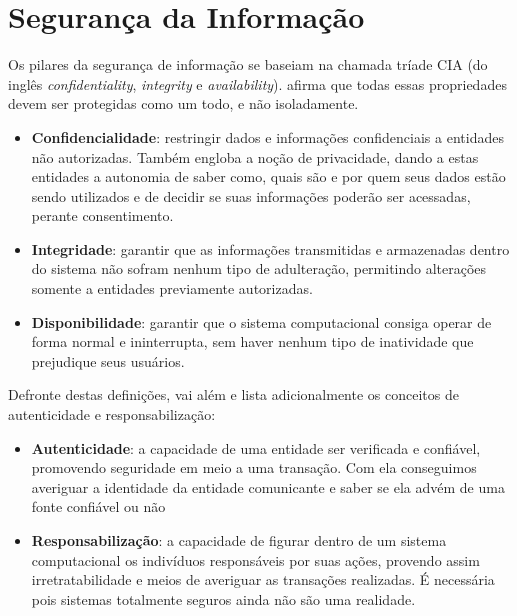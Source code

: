 \section{Segurança da Informação}
Os pilares da segurança de informação se baseiam na chamada tríade CIA (do inglês \emph{confidentiality}, \emph{integrity} e \emph{availability}). \cite{Nakamura2016} afirma que todas essas propriedades devem ser protegidas como um todo, e não isoladamente.

\begin{itemize}
    \item \textbf{Confidencialidade}: restringir dados e informações confidenciais a entidades não autorizadas. Também engloba a noção de privacidade, dando a estas entidades a autonomia de saber como, quais são e por quem seus dados estão sendo utilizados e de decidir se suas informações poderão ser acessadas, perante consentimento.
    \item \textbf{Integridade}: garantir que as informações transmitidas e armazenadas dentro do sistema não sofram nenhum tipo de adulteração, permitindo alterações somente a entidades previamente autorizadas.
    \item \textbf{Disponibilidade}: garantir que o sistema computacional consiga operar de forma normal e ininterrupta, sem haver nenhum tipo de inatividade que prejudique seus usuários.
\end{itemize}

Defronte destas definições, \cite{Stallings2015} vai além e lista adicionalmente os conceitos de autenticidade e responsabilização:
\begin{itemize}
    \item \textbf{Autenticidade}: a capacidade de uma entidade ser verificada e confiável, promovendo seguridade em meio a uma transação. Com ela conseguimos averiguar a identidade da entidade comunicante e saber se ela advém de uma fonte confiável ou não
    \item \textbf{Responsabilização}: a capacidade de figurar dentro de um sistema computacional os indivíduos responsáveis por suas ações, provendo assim irretratabilidade e meios de averiguar as transações realizadas. É necessária pois sistemas totalmente seguros ainda não são uma realidade.
\end{itemize}


